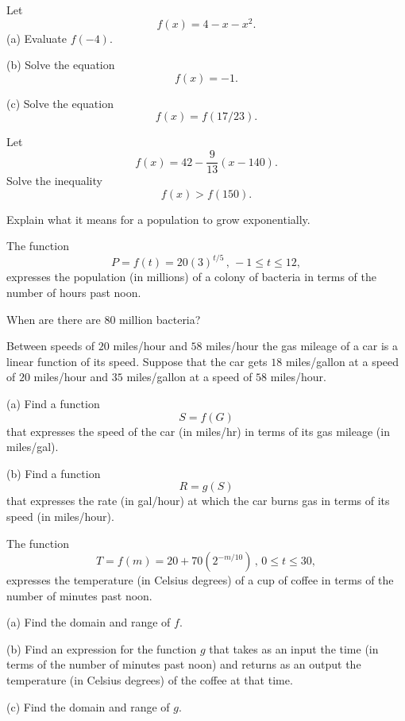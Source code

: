 \documentclass{ximera}
\begin{document}
\begin{question} \label{Qpdf0gbvgbrtg}
Let
\[
      f(x) = 4 - x - x^2 .
\]
(a) Evaluate $f(-4)$.

(b) Solve the equation 
\[
      f(x) = -1 .
\]

(c) Solve the equation
\[
       f(x) = f(17/23) .
\]
\end{question}


\begin{question}  \label{Qdfdcg4tythyh5t}
Let 
\[
       f(x) = 42 - \frac{9}{13}(x - 140) .
\]
Solve the inequality
\[
     f(x) > f(150) .
\]
\end{question}


\begin{question}  \label{Eer5htrree}
Explain what it means for a population to grow exponentially.
\end{question}

\begin{question}
The function
\[
  P = f(t) = 20 (3)^{t/5} \, , \, -1 \leq t \leq 12 ,
\]
expresses the population (in millions) of a colony of bacteria in terms of the number of hours past noon. 

When are there are 80 million bacteria?
\end{question}


\begin{question}  \label{Q99834322}
Between speeds of $20$ miles/hour and $58$ miles/hour the gas mileage of a car is a linear function of its speed. Suppose that the car gets $18$ miles/gallon at a speed of $20$ miles/hour and $35$ miles/gallon at a speed of $58$ miles/hour.

(a) Find a function 
\[
       S = f(G)
\]
that expresses the speed of the car (in miles/hr) in terms of its gas mileage (in miles/gal).

(b) Find a function 
\[
   R = g(S)
\]
that expresses the rate (in gal/hour) at which the car burns gas in terms of its speed (in miles/hour).

\end{question}


\begin{question}  \label{QDFdf4444}
The function
\[
      T = f(m) = 20 + 70 (2^{-m/10}) \, , \, 0 \leq t \leq 30 ,
\]
expresses the temperature (in Celsius degrees) of a cup of coffee in terms of the number of minutes past noon.

(a) Find the domain and range of $f$.

(b) Find an expression for the function $g$ that takes as an input the time (in terms of the number of minutes past noon) and returns as an output the temperature (in Celsius degrees) of the coffee at that time.

(c) Find the domain and range of $g$.

\end{question}
\end{document}
